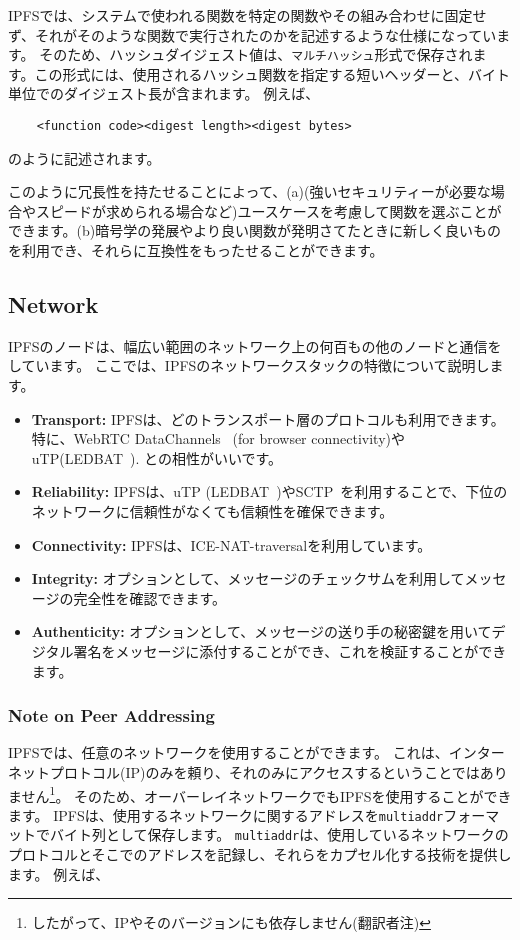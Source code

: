 \documentclass{sig-alternate}
\begin{document}
IPFSでは、システムで使われる関数を特定の関数やその組み合わせに固定せず、それがそのような関数で実行されたのかを記述するような仕様になっています。 そのため、ハッシュダイジェスト値は、\texttt {マルチハッシュ}形式で保存されます。この形式には、使用されるハッシュ関数を指定する短いヘッダーと、バイト単位でのダイジェスト長が含まれます。 例えば、
\begin{verbatim}
    <function code><digest length><digest bytes>
\end{verbatim}
のように記述されます。

このように冗長性を持たせることによって、(a)(強いセキュリティーが必要な場合やスピードが求められる場合など)ユースケースを考慮して関数を選ぶことができます。(b)暗号学の発展やより良い関数が発明さてたときに新しく良いものを利用でき、それらに互換性をもったせることができます。

\subsection{Network}
IPFSのノードは、幅広い範囲のネットワーク上の何百もの他のノードと通信をしています。
ここでは、IPFSのネットワークスタックの特徴について説明します。

\begin{itemize}
  \item \textbf{Transport:} IPFSは、どのトランスポート層のプロトコルも利用できます。特に、WebRTC DataChannels~\cite{WebRTC} (for browser connectivity)やuTP(LEDBAT~\cite{LEDBAT}).
  との相性がいいです。
  \item \textbf{Reliability:} IPFSは、uTP (LEDBAT~\cite{LEDBAT})やSCTP~\cite{SCTP}を利用することで、下位のネットワークに信頼性がなくても信頼性を確保できます。
  \item \textbf{Connectivity:} IPFSは、ICE-NAT-traversal\cite{ICE}を利用しています。
  \item \textbf{Integrity:} オプションとして、メッセージのチェックサムを利用してメッセージの完全性を確認できます。
  \item \textbf{Authenticity:} オプションとして、メッセージの送り手の秘密鍵を用いてデジタル署名をメッセージに添付することができ、これを検証することができます。
\end{itemize}

\subsubsection{Note on Peer Addressing}
IPFSでは、任意のネットワークを使用することができます。 これは、インターネットプロトコル(IP)のみを頼り、それのみにアクセスするということではありません\footnote{したがって、IPやそのバージョンにも依存しません(翻訳者注)}。 そのため、オーバーレイネットワークでもIPFSを使用することができます。 IPFSは、使用するネットワークに関するアドレスを\texttt {multiaddr}フォーマットでバイト列として保存します。 \texttt {multiaddr}は、使用しているネットワークのプロトコルとそこでのアドレスを記録し、それらをカプセル化する技術を提供します。 例えば、
\end{document}
